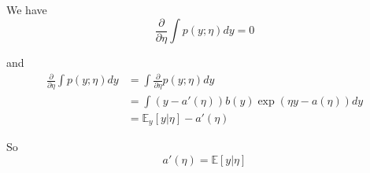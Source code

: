 \begin{answer}
    We have
    $$
    \frac{\partial }{\partial \eta}\int p(y;\eta)dy = 0
    $$

    and 
    $$
    \begin{aligned}
\frac{\partial }{\partial \eta}\int
p(y;\eta)dy &= \int\frac{\partial}{\partial \eta }p(y;\eta)dy\\
&= \int (y - a'(\eta))b(y) \exp(\eta y - a(\eta))dy\\
&=\mathbb E_y[y|\eta] - a'(\eta)
\end{aligned}
$$

So
$$
    a'(\eta) = \mathbb E[y|\eta]
    $$
\end{answer}
